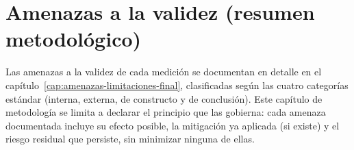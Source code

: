 \section{Amenazas a la validez (resumen metodol\'ogico)}

Las amenazas a la validez de cada medici\'on se documentan en detalle en
el cap\'itulo~\ref{cap:amenazas-limitaciones-final}, clasificadas seg\'un
las cuatro categor\'ias est\'andar (interna, externa, de constructo y de
conclusi\'on). Este cap\'itulo de metodolog\'ia se limita a declarar el
principio que las gobierna: cada amenaza documentada incluye su efecto
posible, la mitigaci\'on ya aplicada (si existe) y el riesgo residual que
persiste, sin minimizar ninguna de ellas.
